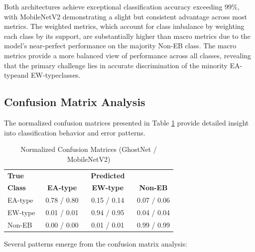 \documentclass[11pt,a4paper]{article}
\newcommand{\EA}{EA-type}
\newcommand{\EW}{EW-type}
\begin{document}
Both architectures achieve exceptional classification accuracy exceeding 99\%, with MobileNetV2 demonstrating a slight but consistent advantage across most metrics. The weighted metrics, which account for class imbalance by weighting each class by its support, are substantially higher than macro metrics due to the model's near-perfect performance on the majority Non-EB class. The macro metrics provide a more balanced view of performance across all classes, revealing that the primary challenge lies in accurate discrimination of the minority \EA and \EW classes.

\subsection{Confusion Matrix Analysis}

The normalized confusion matrices presented in Table \ref{tab:confusion} provide detailed insight into classification behavior and error patterns.

\begin{table}[htbp]
\centering
\caption{Normalized Confusion Matrices (GhostNet / MobileNetV2)}
\label{tab:confusion}
\begin{tabular}{l|ccc}
\toprule
\textbf{True} \ &  \multicolumn{3}{c}{\textbf{Predicted}} \\
\textbf{Class} \ &  \textbf{\EA} \ &  \textbf{\EW} \ &  \textbf{Non-EB} \\
\midrule
\EA \ &  0.78 / 0.80 \ &  0.15 / 0.14 \ &  0.07 / 0.06 \\
\EW \ &  0.01 / 0.01 \ &  0.94 / 0.95 \ &  0.04 / 0.04 \\
Non-EB \ &  0.00 / 0.00 \ &  0.01 / 0.01 \ &  0.99 / 0.99 \\
\bottomrule
\end{tabular}
\end{table}

Several patterns emerge from the confusion matrix analysis:
\end{document}
